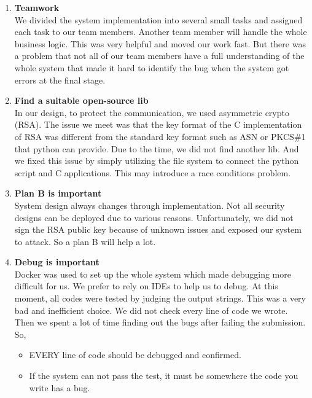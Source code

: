 \documentclass[11pt,oneside,onecolumn,letterpaper]{article}
\begin{document}
\begin{enumerate}
    \item \textbf{Teamwork}\\
    We divided the system implementation into several small tasks and assigned each task to our team members.
    Another team member will handle the whole business logic.
    This was very helpful and moved our work fast.
    But there was a problem that not all of our team members have a full understanding of the whole system that made it hard to identify the bug when the system got errors at the final stage.

    \item \textbf{Find a suitable open-source lib}\\
    In our design, to protect the communication, we used asymmetric crypto (RSA).
    The issue we meet was that the key format of the C implementation of RSA was different from the standard key format such as ASN or PKCS\#1 that python can provide.    
    Due to the time, we did not find another lib.
    And we fixed this issue by simply utilizing the file system to connect the python script and C applications.
    This may introduce a race conditions problem.

    \item \textbf{Plan B is important}\\
    System design always changes through implementation.
    Not all security designs can be deployed due to various reasons.
    Unfortunately, we did not sign the RSA public key because of unknown issues and exposed our system to attack.
    So a plan B will help a lot.

    \item \textbf{Debug is important}\\
    Docker was used to set up the whole system which made debugging more difficult for us.
    We prefer to rely on IDEs to help us to debug.
    At this moment, all codes were tested by judging the output strings.
    This was a very bad and inefficient choice. 
    We did not check every line of code we wrote.
    Then we spent a lot of time finding out the bugs after failing the submission.
    So,
    \begin{itemize}
        \item EVERY line of code should be debugged and confirmed.
        \item If the system can not pass the test, it must be somewhere the code you write has a bug.
    \end{itemize}


\end{enumerate}
\end{document}
